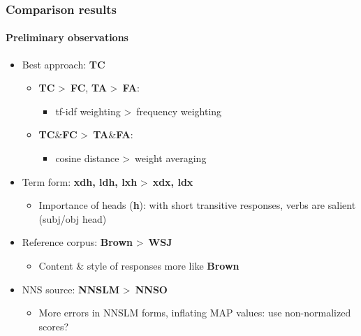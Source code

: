 \documentclass{beamer}
\begin{document}
\begin{frame}
\frametitle{Comparison results}
\framesubtitle{Preliminary observations}
\begin{itemize}
	\item{Best approach: \textbf{TC}}
	\begin{itemize}
		\item{\textbf{TC} \textgreater \ \textbf{FC}, \textbf{TA} \textgreater \ \textbf{FA}:} 
		\begin{itemize}
			\item{tf-idf weighting \textgreater \ frequency weighting}
		\end{itemize}
		\item{\textbf{TC}\&\textbf{FC} \textgreater \ \textbf{TA}\&\textbf{FA}:}
		\begin{itemize}
			\item{cosine distance \textgreater \ weight averaging}
		\end{itemize}
	\end{itemize}
	\item{Term form: \textbf{xdh, ldh, lxh} \textgreater \ \textbf{xdx, ldx}}
	\begin{itemize}
        \item{Importance of heads (\textbf{h}): with short transitive
            responses, verbs are salient (subj/obj head)}
	\end{itemize}
	\item{Reference corpus: \textbf{Brown} \textgreater \ \textbf{WSJ}}
	\begin{itemize}
        \item{Content \& style of responses more like \textbf{Brown}}
	\end{itemize}
	\item{NNS source: \textbf{NNSLM} \textgreater \ \textbf{NNSO}}
	\begin{itemize}
        \item{More errors in NNSLM forms, inflating MAP values:
            use non-normalized scores?}
	\end{itemize}
\end{itemize}

\end{frame}
\end{document}
